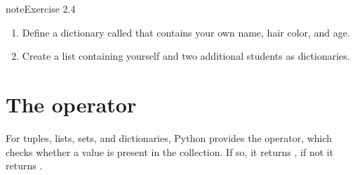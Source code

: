 \documentclass[letterpaper,10pt,english]{jupyterBook}
\begin{document}
\begin{sphinxadmonition}{note}{Exercise 2.4}
\begin{sphinxVerbatim}[commandchars=\\\{\}]
  
        
        
        

\end{sphinxVerbatim}
\begin{enumerate}
%
\setcounter{enumi}{2}
\item {} 
\sphinxAtStartPar
Define a dictionary called  that contains your own name, hair color, and age.

\item {} 
\sphinxAtStartPar
Create a list containing yourself and two additional students as dictionaries.

\end{enumerate}
\end{sphinxadmonition}


\section{The  operator}
\label{\detokenize{notebooks/02_Containers/02_Containers_student:the-in-operator}}
\sphinxAtStartPar
For tuples, lists, sets, and dictionaries, Python provides the  operator, which checks whether a value is present in the collection. If so, it returns , if not it returns .
\end{document}
